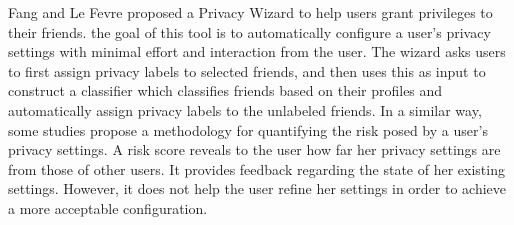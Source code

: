 Fang and Le Fevre \cite{fang_privacy_2010} proposed a Privacy Wizard to help users grant privileges to their friends.
	the goal of this tool is to automatically configure a user’s privacy settings with minimal effort and interaction from the user.
The wizard asks users to first assign privacy labels to selected friends,
	and then uses this as input to construct a classifier which classifies friends based on their profiles and automatically assign privacy labels to the unlabeled friends.
In a similar way,
	some studies \cite{maximilien_privacyasaservice_2009} propose a methodology for quantifying the risk posed by a user’s privacy settings.
A risk score reveals to the user how far her privacy settings are from those of other users.
It provides feedback regarding the state of her existing settings.
However,
	it does not help the user refine her settings in order to achieve a more acceptable configuration.



